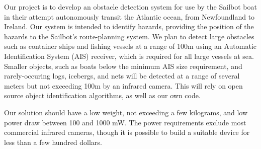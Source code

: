 Our project is to develop an obstacle detection system for use by the Sailbot boat in their attempt autonomously transit the Atlantic ocean, from Newfoundland to Ireland. Our system is intended to identify hazards, providing the position of the hazards to the Sailbot's route-planning system. We plan to detect large obstacles such as container ships and fishing vessels at a range of 100m using an Automatic Identification System (AIS) receiver, which is required for all large vessels at sea. Smaller objects, such as boats below the minimum AIS size requirement, and rarely-occuring logs, icebergs, and nets will be detected at a range of several meters but not exceeding 100m by an infrared camera. This will rely on open source object identification algorithms, as well as our own code.

Our solution should have a low weight, not exceeding a few kilograms, and low power draw between 100 and 1000 mW. The power requirements exclude most commercial infrared cameras, though it is possible to build a suitable device for less than a few hundred dollars.

